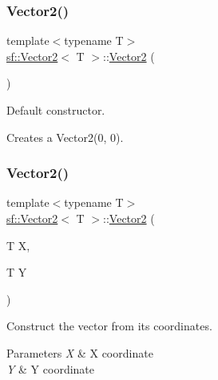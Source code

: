 \subsubsection{\texorpdfstring{Vector2()}{Vector2()}\hspace{0.1cm}{\footnotesize\ttfamily [1/3]}}
{\footnotesize\ttfamily template$<$typename T$>$ \\
\mbox{\hyperlink{classsf_1_1_vector2}{sf\+::\+Vector2}}$<$ T $>$\+::\mbox{\hyperlink{classsf_1_1_vector2}{Vector2}} (\begin{DoxyParamCaption}{ }\end{DoxyParamCaption})}



Default constructor. 

Creates a Vector2(0, 0). \begin{DoxyVerb}\end{DoxyVerb}
 \mbox{\label{classsf_1_1_vector2_aed26a72164e59e8a4a0aeee2049568f1}} 
\subsubsection{\texorpdfstring{Vector2()}{Vector2()}\hspace{0.1cm}{\footnotesize\ttfamily [2/3]}}
{\footnotesize\ttfamily template$<$typename T$>$ \\
\mbox{\hyperlink{classsf_1_1_vector2}{sf\+::\+Vector2}}$<$ T $>$\+::\mbox{\hyperlink{classsf_1_1_vector2}{Vector2}} (\begin{DoxyParamCaption}\item[{T}]{X,  }\item[{T}]{Y }\end{DoxyParamCaption})}



Construct the vector from its coordinates. 


\begin{DoxyParams}{Parameters}
{\em X} & X coordinate \\
\hline
{\em Y} & Y coordinate \begin{DoxyVerb}\end{DoxyVerb}
 \\
\hline
\end{DoxyParams}
\mbox{\label{classsf_1_1_vector2_a3da455e0ae3f8ff6d2fe36d10b332d10}} 
